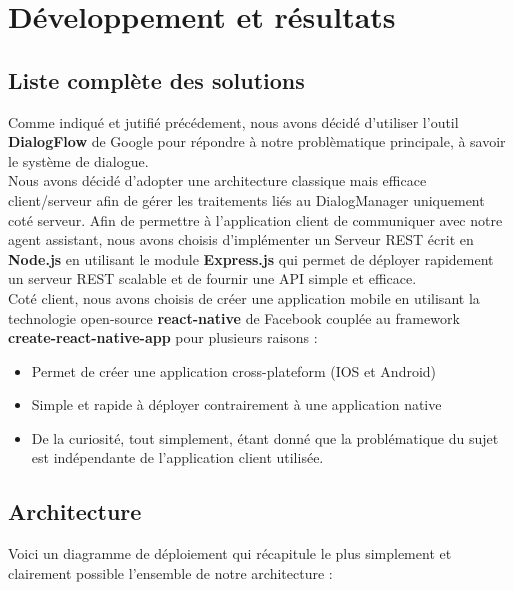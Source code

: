 \chapter{Développement et résultats}

\section{Liste complète des solutions}

Comme indiqué et jutifié précédement, nous avons décidé d'utiliser l'outil \textbf{DialogFlow} de Google\cite{dialogflow} pour répondre à notre problèmatique principale, à savoir 
le système de dialogue.\\

Nous avons décidé d'adopter une architecture classique mais efficace client/serveur afin de gérer les traitements liés au DialogManager uniquement coté serveur. Afin 
de permettre à l'application client de communiquer avec notre agent assistant, nous avons choisis d'implémenter un Serveur REST écrit en \textbf{Node.js}\cite{node} en
utilisant le module \textbf{Express.js}\cite{express} qui permet de déployer rapidement un serveur REST scalable et de fournir une API simple et efficace.\\

Coté client, nous avons choisis de créer une application mobile en utilisant la technologie open-source \textbf{react-native}\cite{reactnative} de Facebook couplée 
au framework \textbf{create-react-native-app}\cite{createnative} pour plusieurs raisons : 
\begin{itemize}
    \item Permet de créer une application cross-plateform (IOS et Android)
    \item Simple et rapide à déployer contrairement à une application native
    \item De la curiosité, tout simplement, étant donné que la problématique du sujet est indépendante de l'application client utilisée.
\end{itemize}

\section{Architecture}

Voici un diagramme de déploiement qui récapitule le plus simplement et clairement possible l'ensemble de notre architecture :

